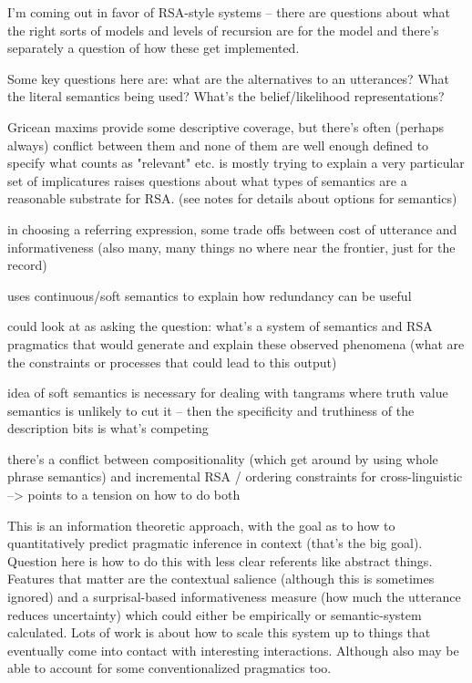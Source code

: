 \documentclass[]{article}
\begin{document}
I'm coming out in favor of RSA-style systems -- there are questions about what the right sorts of models and levels of recursion are for the model and there's separately a question of how these get implemented. 

Some key questions here are: what are the alternatives to an utterances? What the literal semantics being used? What's the belief/likelihood representations? 

Gricean maxims provide some descriptive coverage, but there's often (perhaps always) conflict between them and none of them are well enough defined to specify what counts as "relevant" etc. 
\cite{bergen} is mostly trying to explain a very particular set of implicatures raises questions about what types of semantics are a reasonable substrate for RSA. (see notes for details about options for semantics) 

\cite{degen20200406} in choosing a referring expression, some trade offs between cost of utterance and informativeness (also many, many things no where near the frontier, just for the record) 

\cite{degen20200406} uses continuous/soft semantics to explain how redundancy can be useful

could look at \cite{degen20200406} as asking the question: what's a system of semantics and RSA pragmatics that would generate and explain these observed phenomena (what are the constraints or processes that could lead to this output) 

idea of soft semantics is necessary for dealing with tangrams where truth value semantics is unlikely to cut it -- then the specificity and truthiness of the description bits is what's competing 

there's a conflict between compositionality (which \cite{degen20200406} get around by using whole phrase semantics) and incremental RSA / ordering constraints for cross-linguistic --> points to a tension on how to do both

\cite{frank2012a} This is an information theoretic approach, with the goal as to how to quantitatively predict pragmatic inference in context (that's the big goal). Question here is how to do this with less clear referents like abstract things. Features that matter are the contextual salience (although this is sometimes ignored) and a surprisal-based informativeness measure (how much the utterance reduces uncertainty) which could either be empirically or semantic-system calculated. Lots of work is about how to scale this system up to things that eventually come into contact with interesting interactions. Although also may be able to account for some conventionalized pragmatics too. 
\end{document}

